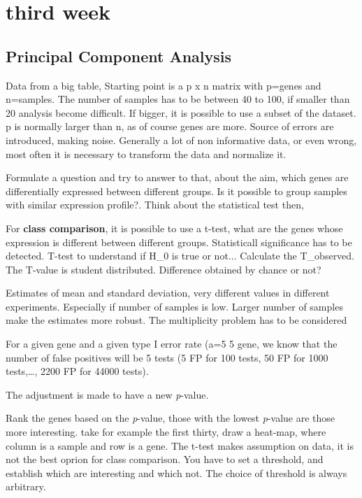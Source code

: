 \graphicspath{{chapters/images/03/}}

\chapter{third week}
\section{Principal Component Analysis}
Data from a big table, Starting point is a p x n matrix with p=genes and n=samples. The number of samples has to be between 40 to 100, if smaller than 20 analysis become difficult. If bigger, it is possible to use a subset of the dataset. p is normally larger than n, as of course genes are more. Source of errors are introduced, making noise. Generally a lot of non informative data, or even wrong, most often it is necessary to transform the data and normalize it. 

Formulate a question and try to answer to that, about the aim, which genes are differentially expressed between different groups. Is it possible to group samples with similar expression profile?. Think about the statistical test then, 

For \textbf{class comparison}, it is possible to use a t-test, what are the genes whose expression is different between different groups. Statisticall significance has to be detected. T-test to understand if H_0 is true or not...
Calculate the T_{observed}. The T-value is student distributed. Difference obtained by chance or not? 

Estimates of mean and standard deviation, very different values in different experiments. Especially if number of samples is low. Larger number of samples make the estimates more robust. The multiplicity problem has to be considered 

For a given gene and a given type I error rate (a=5%
5%
gene, we know that the number of false positives will be 5%
tests (5 FP for 100 tests, 50 FP for 1000 tests,…, 2200 FP for 44000 tests).

The adjustment is made to have a new \textit{p}-value.



Rank the genes based on the \textit{p}-value, those with the lowest \textit{p}-value are those more interesting. take for example the first thirty, draw a heat-map, where column is a sample and row is a gene. The t-test makes assumption on data, it is not the best oprion for class comparison. You have to set a threshold, and establish which are interesting and which not. The choice of threshold is always arbitrary. 

